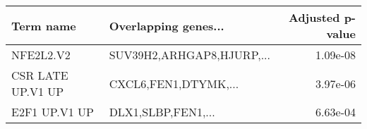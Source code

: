 \begin{tabular}{llr}
\toprule
        Term name &      Overlapping genes... &  Adjusted p-value \\
\midrule
        NFE2L2.V2 & SUV39H2,ARHGAP8,HJURP,... &          1.09e-08 \\
CSR LATE UP.V1 UP &      CXCL6,FEN1,DTYMK,... &          3.97e-06 \\
    E2F1 UP.V1 UP &        DLX1,SLBP,FEN1,... &          6.63e-04 \\
\bottomrule
\end{tabular}
